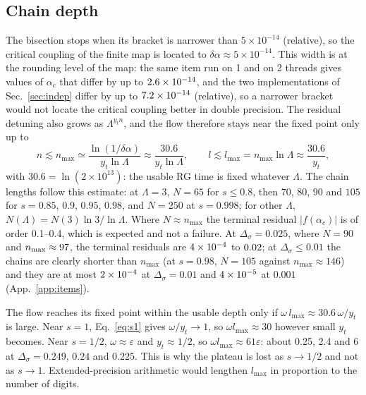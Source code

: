 \documentclass[10pt,a4paper]{article}
\newcommand{\Ds}{\Delta_\sigma}
\begin{document}
\subsection{Chain depth}\label{sec:depth}
The bisection stops when its bracket is narrower than $5\times10^{-14}$ (relative), so the critical coupling of the finite map is
located to $\delta\alpha\approx5\times10^{-14}$. This width is at the rounding level of the map: the same item run on 1 and on 2 threads
gives values of $\alpha_c$ that differ by up to $2.6\times10^{-14}$, and the two implementations of Sec.~\ref{sec:indep} differ by up to
$7.2\times10^{-14}$ (relative), so a narrower bracket would not locate the critical coupling better in double precision. The residual
detuning also grows as $\Lambda^{y_tn}$, and the flow therefore stays near the fixed point only up to
\begin{equation}
n\lesssim n_{\max}\simeq\frac{\ln(1/\delta\alpha)}{y_t\ln\Lambda}\approx\frac{30.6}{y_t\ln\Lambda},\qquad
l\lesssim l_{\max}=n_{\max}\ln\Lambda\approx\frac{30.6}{y_t},\label{eq:nmax}
\end{equation}
with $30.6=\ln(2\times10^{13})$: the usable RG time is fixed whatever $\Lambda$. The chain lengths follow this estimate: at
$\Lambda=3$, $N=65$ for $s\le0.8$, then $70$, $80$, $90$ and $105$ for $s=0.85$, $0.9$, $0.95$, $0.98$, and $N=250$ at $s=0.998$; for
other $\Lambda$, $N(\Lambda)=N(3)\ln3/\ln\Lambda$. Where $N\approx n_{\max}$ the terminal residual $|f(\alpha_c)|$ is of order 0.1--0.4,
which is expected and not a failure. At $\Ds=0.025$, where $N=90$ and $n_{\max}\approx97$, the terminal residuals are
$4\times10^{-4}$ to $0.02$; at $\Ds\le0.01$ the chains are clearly shorter than $n_{\max}$ (at $s=0.98$, $N=105$
against $n_{\max}\approx146$) and they are at most $2\times10^{-4}$ at $\Ds=0.01$ and $4\times10^{-5}$ at $0.001$ (App.~\ref{app:items}).

The flow reaches its fixed point within the usable depth only if $\omega\,l_{\max}\approx30.6\,\omega/y_t$ is large. Near $s=1$,
Eq.~\eqref{eq:s1} gives $\omega/y_t\to1$, so $\omega l_{\max}\approx30$ however small $y_t$ becomes. Near $s=1/2$, $\omega\approx\varepsilon$
and $y_t\approx1/2$, so $\omega l_{\max}\approx61\varepsilon$: about 0.25, 2.4 and 6 at $\Ds=0.249$, $0.24$ and $0.225$. This is why the
plateau is lost as $s\to1/2$ and not as $s\to1$. Extended-precision arithmetic would lengthen $l_{\max}$ in proportion to the number of
digits.

\end{document}
